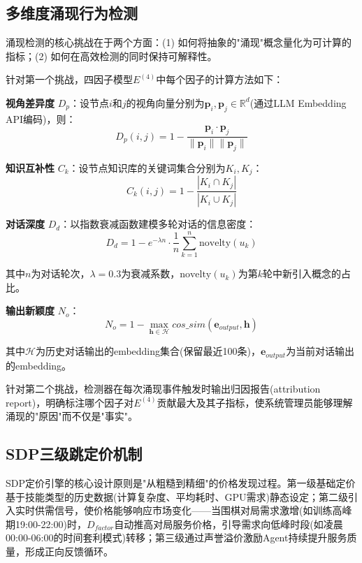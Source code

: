 \documentclass[12pt,a4paper]{ctexart}
\begin{document}
\subsection{多维度涌现行为检测}

涌现检测的核心挑战在于两个方面：(1) 如何将抽象的"涌现"概念量化为可计算的指标；(2) 如何在高效检测的同时保持可解释性。

针对第一个挑战，四因子模型$E^{(4)}$中每个因子的计算方法如下：

\textbf{视角差异度} $D_p$：设节点$i$和$j$的视角向量分别为$\mathbf{p}_i, \mathbf{p}_j \in \mathbb{R}^{d}$(通过LLM Embedding API编码)，则：
\begin{equation}
D_p(i, j) = 1 - \frac{\mathbf{p}_i \cdot \mathbf{p}_j}{\|\mathbf{p}_i\| \|\mathbf{p}_j\|}
\label{eq:dp}
\end{equation}

\textbf{知识互补性} $C_k$：设节点知识库的关键词集合分别为$K_i, K_j$：
\begin{equation}
C_k(i, j) = 1 - \frac{|K_i \cap K_j|}{|K_i \cup K_j|}
\label{eq:ck}
\end{equation}

\textbf{对话深度} $D_d$：以指数衰减函数建模多轮对话的信息密度：
\begin{equation}
D_d = 1 - e^{-\lambda n} \cdot \frac{1}{n} \sum_{k=1}^{n} \text{novelty}(u_k)
\label{eq:dd}
\end{equation}

其中$n$为对话轮次，$\lambda=0.3$为衰减系数，$\text{novelty}(u_k)$为第$k$轮中新引入概念的占比。

\textbf{输出新颖度} $N_o$：
\begin{equation}
N_o = 1 - \max_{\mathbf{h} \in \mathcal{H}} cos\_sim(\mathbf{e}_{output}, \mathbf{h})
\label{eq:no}
\end{equation}

其中$\mathcal{H}$为历史对话输出的embedding集合(保留最近100条)，$\mathbf{e}_{output}$为当前对话输出的embedding。

针对第二个挑战，检测器在每次涌现事件触发时输出归因报告(attribution report)，明确标注哪个因子对$E^{(4)}$贡献最大及其子指标，使系统管理员能够理解涌现的"原因"而不仅是"事实"。

\subsection{SDP三级跳定价机制}

SDP定价引擎的核心设计原则是"从粗糙到精细"的价格发现过程。第一级基础定价基于技能类型的历史数据(计算复杂度、平均耗时、GPU需求)静态设定；第二级引入实时供需信号，使价格能够响应市场变化——当围棋对局需求激增(如训练高峰期19:00-22:00)时，$D_{factor}$自动推高对局服务价格，引导需求向低峰时段(如凌晨00:00-06:00的时间套利模式)转移；第三级通过声誉溢价激励Agent持续提升服务质量，形成正向反馈循环。
\end{document}
